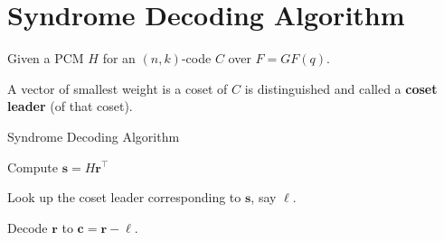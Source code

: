 \section{Syndrome Decoding Algorithm}
Given a PCM $ H $ for an $ (n,k) $-code $ C $ over $ F=GF(q) $.

\begin{defbox}
    \begin{definition}
        A vector of smallest weight is a coset of $ C $ is distinguished and called
        a \textbf{coset leader} (of that coset).
    \end{definition}
\end{defbox}

\begin{algbox}
    \begin{algorithm}[H]
        \caption{Syndrome Decoding Algorithm}
        \While{} {
        Compute $ \bm{s}=H\bm{r}^\top $

        Look up the coset leader corresponding to $ \bm{s} $, say $ \bm{\ell} $.

        Decode $ \bm{r} $ to $ \bm{c}=\bm{r}-\bm{\ell} $.
        }
    \end{algorithm}
\end{algbox}

